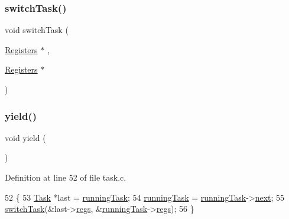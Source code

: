 \mbox{\label{a00050_a2425ca34147fccde2d1503332d21c5bd_a2425ca34147fccde2d1503332d21c5bd}} 
\subsubsection{\texorpdfstring{switch\+Task()}{switchTask()}}
{\footnotesize\ttfamily void switch\+Task (\begin{DoxyParamCaption}\item[{\hyperlink{a00132}{Registers} $\ast$}]{,  }\item[{\hyperlink{a00132}{Registers} $\ast$}]{ }\end{DoxyParamCaption})}

\mbox{\label{a00050_a58c8b2ad0ea491a6642e5e1cbd358c89_a58c8b2ad0ea491a6642e5e1cbd358c89}} 
\subsubsection{\texorpdfstring{yield()}{yield()}}
{\footnotesize\ttfamily void yield (\begin{DoxyParamCaption}{ }\end{DoxyParamCaption})}



Definition at line 52 of file task.\+c.


\begin{DoxyCode}
52              \{
53     \hyperlink{a00136}{Task} *last = \hyperlink{a00047_a2c195d425b4a6791b3a89f7b219f93d9_a2c195d425b4a6791b3a89f7b219f93d9}{runningTask};
54     \hyperlink{a00047_a2c195d425b4a6791b3a89f7b219f93d9_a2c195d425b4a6791b3a89f7b219f93d9}{runningTask} = \hyperlink{a00047_a2c195d425b4a6791b3a89f7b219f93d9_a2c195d425b4a6791b3a89f7b219f93d9}{runningTask}->\hyperlink{a00136_a8b6b50960a19f7bae344ef0cc8ec4e7d_a8b6b50960a19f7bae344ef0cc8ec4e7d}{next};
55     \hyperlink{a00050_a2425ca34147fccde2d1503332d21c5bd_a2425ca34147fccde2d1503332d21c5bd}{switchTask}(&last->\hyperlink{a00136_a136b243ee52ff89e9ba97f4e4dba19bb_a136b243ee52ff89e9ba97f4e4dba19bb}{regs}, &\hyperlink{a00047_a2c195d425b4a6791b3a89f7b219f93d9_a2c195d425b4a6791b3a89f7b219f93d9}{runningTask}->\hyperlink{a00136_a136b243ee52ff89e9ba97f4e4dba19bb_a136b243ee52ff89e9ba97f4e4dba19bb}{regs});
56 \}
\end{DoxyCode}
